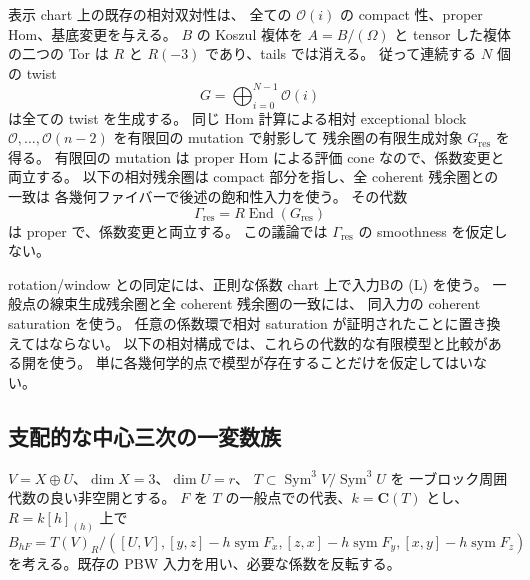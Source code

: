 表示 chart 上の既存の相対双対性は、
全ての $\mathcal O(i)$ の compact 性、proper Hom、基底変更を与える。
$B$ の Koszul 複体を $A=B/(\Omega)$ と tensor した複体の二つの Tor は
$R$ と $R(-3)$ であり、tails では消える。
従って連続する $N$ 個の twist
\[
 G=\bigoplus_{i=0}^{N-1}\mathcal O(i)
\]
は全ての twist を生成する。
同じ Hom 計算による相対 exceptional block
$\mathcal O,\ldots,\mathcal O(n-2)$ を有限回の mutation で射影して
残余圏の有限生成対象 $G_{\mathrm{res}}$ を得る。
有限回の mutation は proper Hom による評価 cone なので、係数変更と両立する。
以下の相対残余圏は compact 部分を指し、全 coherent 残余圏との一致は
各幾何ファイバーで後述の飽和性入力を使う。
その代数
\[
 \Gamma_{\mathrm{res}}=R\operatorname{End}(G_{\mathrm{res}})
\]
は proper で、係数変更と両立する。
この議論では $\Gamma_{\mathrm{res}}$ の smoothness を仮定しない。

rotation/window との同定には、正則な係数 chart 上で入力Bの (L) を使う。
一般点の線束生成残余圏と全 coherent 残余圏の一致には、
同入力の coherent saturation を使う。
任意の係数環で相対 saturation が証明されたことに置き換えてはならない。
以下の相対構成では、これらの代数的な有限模型と比較がある開を使う。
単に各幾何学的点で模型が存在することだけを仮定してはいない。

\subsection{支配的な中心三次の一変数族}

$V=X\oplus U$、$\dim X=3$、$\dim U=r$、
$T\subset\operatorname{Sym}^3V/\operatorname{Sym}^3U$ を
一ブロック周囲代数の良い非空開とする。
$F$ を $T$ の一般点での代表、$k=\mathbf C(T)$ とし、
$R=k[h]_{(h)}$ 上で
\[
 B_{hF}=T(V)_R/
 ([U,V],[y,z]-h\operatorname{sym}F_x,
 [z,x]-h\operatorname{sym}F_y,[x,y]-h\operatorname{sym}F_z)
\]
を考える。既存の PBW 入力を用い、必要な係数を反転する。

